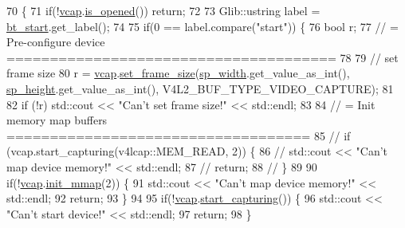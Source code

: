 \begin{DoxyCode}
70                                                 \{
71         \textcolor{keywordflow}{if}(!\hyperlink{class_v_s_s_s___g_u_i_1_1_v4_l_interface_a7ece61f4ccc6d5321c445e60f34e7f33}{vcap}.\hyperlink{classv4lcap_a0feac915e89a04f087bce5310f8b1051}{is\_opened}()) \textcolor{keywordflow}{return};
72 
73         Glib::ustring label = \hyperlink{class_v_s_s_s___g_u_i_1_1_v4_l_interface_a95958ffffbfb95a6a0fdefb2ffa6d3b9}{bt\_start}.get\_label();
74 
75         \textcolor{keywordflow}{if}(0 == label.compare(\textcolor{stringliteral}{"start"})) \{
76             \textcolor{keywordtype}{bool} r;
77             \textcolor{comment}{// = Pre-configure device ======================================}
78 
79             \textcolor{comment}{// set frame size}
80             r = \hyperlink{class_v_s_s_s___g_u_i_1_1_v4_l_interface_a7ece61f4ccc6d5321c445e60f34e7f33}{vcap}.\hyperlink{classv4lcap_a6ad01c926c3162e858e030c8525cb94b}{set\_frame\_size}(\hyperlink{class_v_s_s_s___g_u_i_1_1_v4_l_interface_a0f492cb2c65c4021c9b9b81f4a185e84}{sp\_width}.get\_value\_as\_int(), 
      \hyperlink{class_v_s_s_s___g_u_i_1_1_v4_l_interface_a7b095a3a9dc7a5895f3bac68b05b8210}{sp\_height}.get\_value\_as\_int(), V4L2\_BUF\_TYPE\_VIDEO\_CAPTURE);
81 
82             \textcolor{keywordflow}{if} (!r) std::cout << \textcolor{stringliteral}{"Can't set frame size!"} << std::endl;
83 
84             \textcolor{comment}{// = Init memory map buffers ===================================}
85             \textcolor{comment}{//          if (vcap.start\_capturing(v4lcap::MEM\_READ, 2)) \{}
86             \textcolor{comment}{//              std::cout << "Can't map device memory!" << std::endl;}
87             \textcolor{comment}{//              return;}
88             \textcolor{comment}{//          \}}
89 
90             \textcolor{keywordflow}{if}(!\hyperlink{class_v_s_s_s___g_u_i_1_1_v4_l_interface_a7ece61f4ccc6d5321c445e60f34e7f33}{vcap}.\hyperlink{classv4lcap_a04f75c0a68f0e8547925906a488bb50d}{init\_mmap}(2)) \{
91                 std::cout << \textcolor{stringliteral}{"Can't map device memory!"} << std::endl;
92                 \textcolor{keywordflow}{return};
93             \}
94 
95             \textcolor{keywordflow}{if}(!\hyperlink{class_v_s_s_s___g_u_i_1_1_v4_l_interface_a7ece61f4ccc6d5321c445e60f34e7f33}{vcap}.\hyperlink{classv4lcap_a4a7ee51c878ec735c9a24b517c63df16}{start\_capturing}()) \{
96                 std::cout << \textcolor{stringliteral}{"Can't start device!"} << std::endl;
97                 \textcolor{keywordflow}{return};
98             \}

\end{DoxyCode}
